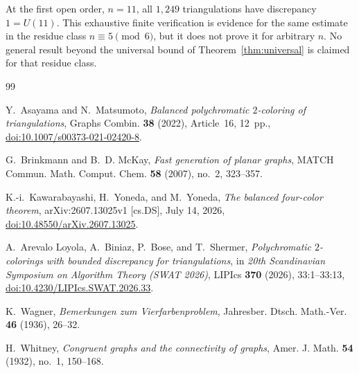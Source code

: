 \documentclass[11pt]{amsart}
\begin{document}
At the first open order, $n=11$, all $1{,}249$ triangulations have discrepancy
$1=U(11)$.  This exhaustive finite verification is evidence for the same
estimate in the residue class $n\equiv5\pmod6$, but it does not prove it for
arbitrary $n$.  No general result beyond the universal bound of
Theorem~\ref{thm:universal} is claimed for that residue class.

\begin{thebibliography}{99}

Y.~Asayama and N.~Matsumoto,
\emph{Balanced polychromatic $2$-coloring of triangulations},
Graphs Combin. \textbf{38} (2022), Article~16, 12~pp.,
\href{https://doi.org/10.1007/s00373-021-02420-8}
{doi:10.1007/s00373-021-02420-8}.

G.~Brinkmann and B.~D. McKay,
\emph{Fast generation of planar graphs},
MATCH Commun. Math. Comput. Chem. \textbf{58} (2007), no.~2, 323--357.

K.-i.~Kawarabayashi, H.~Yoneda, and M.~Yoneda,
\emph{The balanced four-color theorem},
arXiv:2607.13025v1 [cs.DS], July 14, 2026,
\href{https://doi.org/10.48550/arXiv.2607.13025}
{doi:10.48550/arXiv.2607.13025}.

A.~Arevalo Loyola, A.~Biniaz, P.~Bose, and T.~Shermer,
\emph{Polychromatic $2$-colorings with bounded discrepancy for
triangulations},
in \emph{20th Scandinavian Symposium on Algorithm Theory (SWAT 2026)},
LIPIcs \textbf{370} (2026), 33:1--33:13,
\href{https://doi.org/10.4230/LIPIcs.SWAT.2026.33}
{doi:10.4230/LIPIcs.SWAT.2026.33}.

K.~Wagner,
\emph{Bemerkungen zum Vierfarbenproblem},
Jahresber. Dtsch. Math.-Ver. \textbf{46} (1936), 26--32.

H.~Whitney,
\emph{Congruent graphs and the connectivity of graphs},
Amer. J. Math. \textbf{54} (1932), no.~1, 150--168.

\end{thebibliography}
\end{document}
